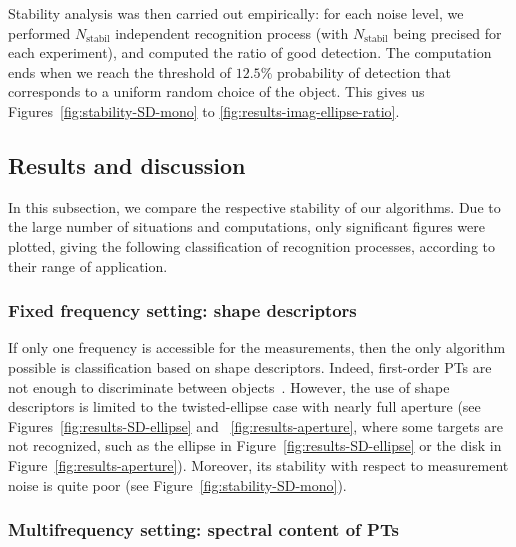 Stability analysis was then carried out empirically: for each
noise level, we performed $N_{\textrm{stabil}}$ independent
recognition
 process (with $N_{\textrm{stabil}}$ being precised for each experiment), and computed the ratio of good detection. The computation ends when we reach the threshold of $12.5\%$ probability of detection that corresponds to a
 uniform random choice of the object. This gives us Figures~\ref{fig:stability-SD-mono} to
 \ref{fig:results-imag-ellipse-ratio}.



\subsection{Results and discussion}

\label{sub:results}

In this subsection, we compare the respective stability of our algorithms.
Due to the large number of situations and computations, only significant figures
were plotted, giving the following classification of recognition processes,
according to their range of application.


\subsubsection{Fixed frequency setting: shape descriptors}

If only one frequency is accessible for the measurements, then the
only algorithm possible is classification based on shape
descriptors. Indeed, first-order PTs are not enough to
discriminate between objects~\cite{bruhl2003direct}. However, the use of shape
descriptors is limited to the twisted-ellipse case with nearly
full aperture (see Figures~\ref{fig:results-SD-ellipse} and
~\ref{fig:results-aperture}, where some targets are not
recognized, such as the ellipse in
Figure~\ref{fig:results-SD-ellipse} or the disk in
Figure~\ref{fig:results-aperture}). Moreover, its stability with
respect to measurement noise is quite poor (see
Figure~\ref{fig:stability-SD-mono}).

\subsubsection{Multifrequency setting: spectral content of PTs}

